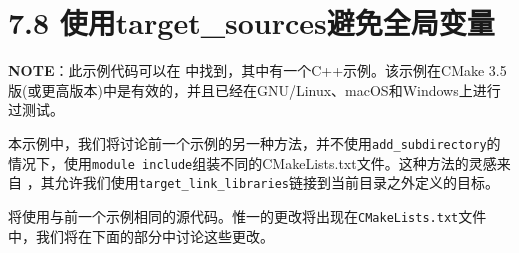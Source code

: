 \section{7.8 使用target\_sources避免全局变量}

\begin{myInfoBox}
\textbf{NOTE}：此示例代码可以在  中找到，其中有一个C++示例。该示例在CMake 3.5版(或更高版本)中是有效的，并且已经在GNU/Linux、macOS和Windows上进行过测试。
\end{myInfoBox}

本示例中，我们将讨论前一个示例的另一种方法，并不使用\texttt{add\_subdirectory}的情况下，使用\texttt{module include}组装不同的CMakeLists.txt文件。这种方法的灵感来自 ，其允许我们使用\texttt{target\_link\_libraries}链接到当前目录之外定义的目标。


将使用与前一个示例相同的源代码。惟一的更改将出现在\texttt{CMakeLists.txt}文件中，我们将在下面的部分中讨论这些更改。


